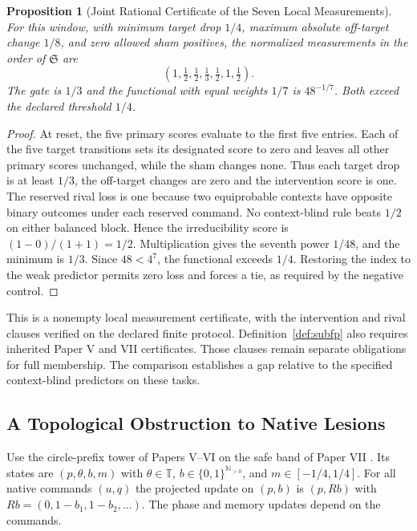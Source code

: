 \documentclass[11pt,a4paper]{article}
\newtheorem{proposition}[theorem]{Proposition}
\theoremstyle{definition}
\newcommand{\Substate}{\mathfrak{S}}
\begin{document}
\begin{proposition}[Joint Rational Certificate of the Seven Local Measurements]\label{prop:joint-rational-window}
For this window, with minimum target drop $1/4$, maximum absolute off-target change $1/8$, and zero allowed sham positives, the normalized measurements in the order of $\Substate$ are
\[
 (1,\tfrac12,\tfrac12,\tfrac13,\tfrac12,1,\tfrac12).
\]
The gate is $1/3$ and the functional with equal weights $1/7$ is $48^{-1/7}$. Both exceed the declared threshold $1/4$.
\end{proposition}
\begin{proof}
At reset, the five primary scores evaluate to the first five entries. Each of the five target transitions sets its designated score to zero and leaves all other primary scores unchanged, while the sham changes none. Thus each target drop is at least $1/3$, the off-target changes are zero and the intervention score is one. The reserved rival loss is one because two equiprobable contexts have opposite binary outcomes under each reserved command. No context-blind rule beats $1/2$ on either balanced block. Hence the irreducibility score is $(1-0)/(1+1)=1/2$. Multiplication gives the seventh power $1/48$, and the minimum is $1/3$. Since $48<4^7$, the functional exceeds $1/4$. Restoring the index to the weak predictor permits zero loss and forces a tie, as required by the negative control.
\end{proof}

This is a nonempty local measurement certificate, with the intervention and rival clauses verified on the declared finite protocol. Definition~\ref{def:subfp} also requires inherited Paper V and VII certificates. Those clauses remain separate obligations for full membership. The comparison establishes a gap relative to the specified context-blind predictors on these tasks.

\subsection{A Topological Obstruction to Native Lesions}

Use the circle-prefix tower of Papers V--VI \cite{paper5,paper6} on the safe band of Paper VII \cite{paper7}. Its states are $(p,\theta,b,m)$ with $\theta\in\mathbb T$, $b\in\{0,1\}^{\mathbb N_{>0}}$, and $m\in[-1/4,1/4]$. For all native commands $(u,q)$ the projected update on $(p,b)$ is $(p,Rb)$ with $Rb=(0,1-b_1,1-b_2,\ldots)$. The phase and memory updates depend on the commands.
\end{document}
